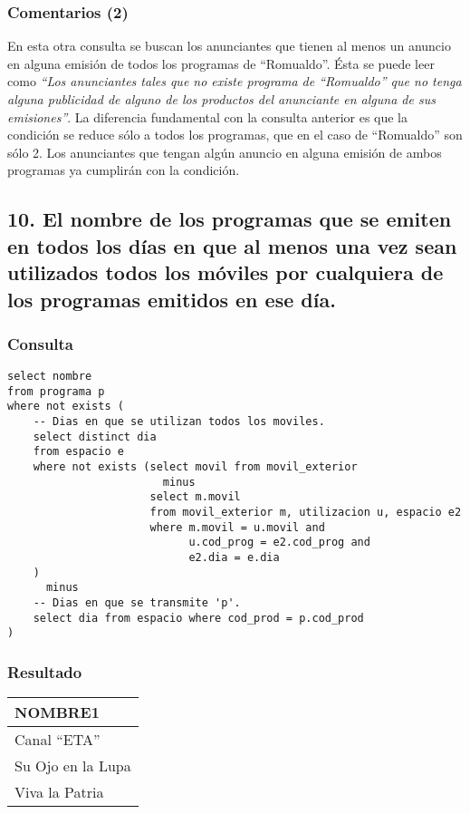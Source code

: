 \subsubsection*{Comentarios (2)}
En esta otra consulta se buscan los anunciantes que tienen al menos un anuncio en alguna emisión de todos los programas de ``Romualdo''. Ésta se puede leer como \textit{``Los anunciantes tales que no existe programa de ``Romualdo'' que no tenga alguna publicidad de alguno de los productos del anunciante en alguna de sus emisiones''}. La diferencia fundamental con la consulta anterior es que la condición se reduce sólo a todos los programas, que en el caso de ``Romualdo'' son sólo 2. Los anunciantes que tengan algún anuncio en alguna emisión de ambos programas ya cumplirán con la condición. \\

\subsection*{10. \normalsize{El nombre de los programas que se emiten en todos los d\'ias en que al menos una vez sean utilizados todos los m\'oviles por cualquiera de los programas emitidos en ese d\'ia.}}

\subsubsection*{Consulta}
\begin{lstlisting} 
select nombre 
from programa p
where not exists (
    -- Dias en que se utilizan todos los moviles.
    select distinct dia 
    from espacio e
    where not exists (select movil from movil_exterior
                        minus
                      select m.movil
                      from movil_exterior m, utilizacion u, espacio e2
                      where m.movil = u.movil and 
                            u.cod_prog = e2.cod_prog and 
                            e2.dia = e.dia
    )
      minus
    -- Dias en que se transmite 'p'.
    select dia from espacio where cod_prod = p.cod_prod
)

\end{lstlisting}

\subsubsection*{Resultado}
\begin{tabular}{|l|}
  \hline
    \bf{NOMBRE1} \\ 
  \hline
    Canal ``ETA'' \\ 
    Su Ojo en la Lupa \\
    Viva la Patria \\ 
  \hline
\end{tabular} 

